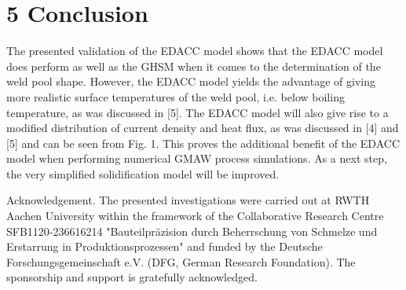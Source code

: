 \documentclass[10pt]{article}
\begin{document}
\section*{5 Conclusion}
The presented validation of the EDACC model shows that the EDACC model does perform as well as the GHSM when it comes to the determination of the weld pool shape. However, the EDACC model yields the advantage of giving more realistic surface temperatures of the weld pool, i.e. below boiling temperature, as was discussed in [5]. The EDACC model will also give rise to a modified distribution of current density and heat flux, as was discussed in [4] and [5] and can be seen from Fig. 1. This proves the additional benefit of the EDACC model when performing numerical GMAW process simulations. As a next step, the very simplified solidification model will be improved.

Acknowledgement. The presented investigations were carried out at RWTH Aachen University within the framework of the Collaborative Research Centre SFB1120-236616214 "Bauteilpräzision durch Beherrschung von Schmelze und Erstarrung in Produktionsprozessen" and funded by the Deutsche Forschungsgemeinschaft e.V. (DFG, German Research Foundation). The sponsorship and support is gratefully acknowledged.
\end{document}
